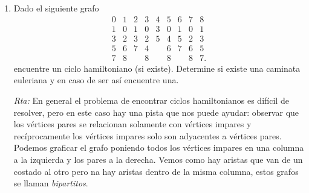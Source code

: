 \documentclass[a4paper,12pt,twoside,spanish,reqno]{amsbook}
\numberwithin{equation}{section}
\newcommand{\rta}{\noindent\textit{Rta: }}
\begin{document}
\begin{enumerate}
\begin{enumerate}
        (iii) (5) y (1). 
        
        \rta 
        En (1) hay un vértice de valencia 4 mientras que  en (5) no lo hay, por lo tanto los grafos no son isomorfos. 
        
        
        
        \item Halle las componentes conexas del grafo (7).
        
        \rta Los subgrafos con vértices $\{1,6,12,9 \}$, $\{4,2,5 \}$ y $\{3,7,11,10,8 \}$ son las componentes conexas de (7).
        
    
    \end{enumerate}

    

    \item\label{ej-ciclo-hamiltoniano} Dado el siguiente grafo
    $$
    \begin{matrix}
    0&1&2&3&4&5&6&7&8\\ \hline
    1&0&1&0&3&0&1&0&1\\
    3&2&3&2&5&4&5&2&3\\
    5&6&7&4& &6&7&6&5\\
    7&8& &8& &8& &8&7.
    \end{matrix}
    $$
    encuentre un ciclo hamiltoniano (si existe). Determine si existe una caminata euleriana y en caso de ser así encuentre una. 
    
    \rta En  general el  problema de encontrar ciclos hamiltonianos es difícil de resolver, pero en este caso hay una pista que nos puede ayudar: observar que los vértices pares se relacionan solamente con vértices impares y recíprocamente los vértices impares solo son adyacentes a vértices pares. Podemos graficar el grafo  poniendo todos los vértices impares en una columna a la izquierda y los pares a la derecha. Vemos como hay aristas que van de un costado al otro pero  na hay aristas dentro de la misma columna, estos grafos se llaman  \textit{bipartitos}.  
    

\end{enumerate}
\end{document}
